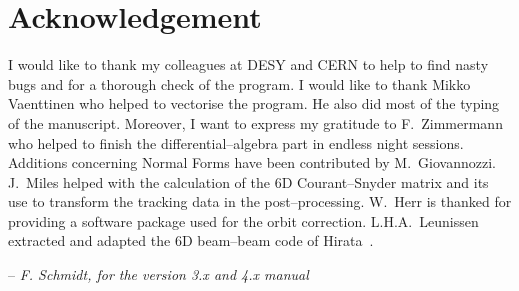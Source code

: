 \chapter*{Acknowledgement}

I would like to thank my colleagues at DESY and CERN to help to find nasty bugs and for a thorough check of the program.
I would like to thank Mikko Vaenttinen who helped to vectorise the program.
He also did most of the typing of the manuscript.
Moreover, I want to express my gratitude to F.~Zimmermann who helped to finish the differential--algebra part in endless night sessions.
Additions concerning Normal Forms have been contributed by M.~Giovannozzi.
J.~Miles helped with the calculation of the 6D Courant--Snyder matrix and its use to transform the tracking data in the post--processing.
W.~Herr is thanked for providing a software package used for the orbit correction. L.H.A.~Leunissen extracted and adapted the 6D beam--beam code of Hirata~\cite{Hirata}.

\bigskip
\begin{flushright}
    -- \textit{F. Schmidt, for the version 3.x and 4.x manual}
\end{flushright}
